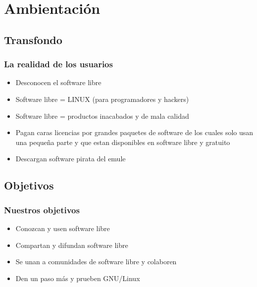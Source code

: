 
\section{Ambientación}
	\subsection{Transfondo} %
	\begin{frame}
		\frametitle{La realidad de los usuarios}
		\begin{itemize}
			\item <1-| alert@1> Desconocen el software libre
			\item <2-| alert@2> Software libre = LINUX (para programadores y hackers)
			\item <3-| alert@3> Software libre = productos inacabados y de mala calidad
			\item <4-| alert@4> Pagan caras licencias por grandes paquetes de software de los cuales solo usan una pequeña parte y que estan disponibles en software libre y gratuito
			\item <5-| alert@5> Descargan software pirata del emule
		\end{itemize}
	\end{frame}

	\subsection{Objetivos} %
	\begin{frame}
		\frametitle{Nuestros objetivos}
		\setbeamercovered{invisible}
		\begin{itemize}
			\item <1-| alert@1> Conozcan y usen software libre
			\item <2-| alert@2> Compartan y difundan software libre
			\item <3-| alert@3> Se unan a comunidades de software libre y colaboren
			\item <4-| alert@4> Den un paso más y prueben GNU/Linux
		\end{itemize}
	\end{frame}